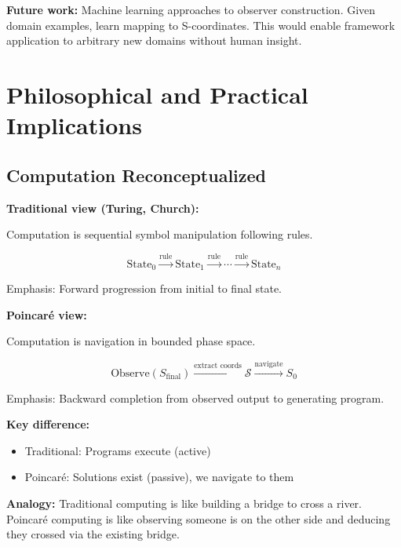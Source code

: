 \documentclass[twocolumn,10pt]{article}
\theoremstyle{definition}
\theoremstyle{remark}
\newcommand{\Sspace}{\mathcal{S}}
\begin{document}
\vspace{0.2cm}
\noindent\textbf{Future work:} Machine learning approaches to observer construction. Given domain examples, learn mapping to S-coordinates. This would enable framework application to arbitrary new domains without human insight.

\section{Philosophical and Practical Implications}
\label{sec:implications}

\subsection{Computation Reconceptualized}

\textbf{Traditional view (Turing\cite{turing1936}, Church\cite{church1936}):}

Computation is sequential symbol manipulation following rules.

\begin{equation}
\text{State}_0 \xrightarrow{\text{rule}} \text{State}_1 \xrightarrow{\text{rule}} \cdots \xrightarrow{\text{rule}} \text{State}_n
\end{equation}

Emphasis: Forward progression from initial to final state.

\vspace{0.2cm}
\noindent\textbf{Poincaré view:}

Computation is navigation in bounded phase space.

\begin{equation}
\text{Observe}(S_{\text{final}}) \xrightarrow{\text{extract coords}} \Sspace \xrightarrow{\text{navigate}} S_0
\end{equation}

Emphasis: Backward completion from observed output to generating program.

\vspace{0.2cm}
\noindent\textbf{Key difference:}
\begin{itemize}
\item Traditional: Programs execute (active)
\item Poincaré: Solutions exist (passive), we navigate to them
\end{itemize}

\textbf{Analogy:} Traditional computing is like building a bridge to cross a river. Poincaré computing is like observing someone is on the other side and deducing they crossed via the existing bridge.
\end{document}
